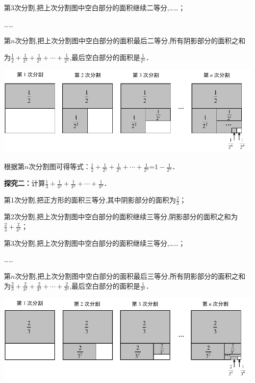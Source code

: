 \documentclass[10pt,a4paper]{ctexart}
\begin{document}
	第3次分割,把上次分割图中空白部分的面积继续二等分,{\ldots}{\ldots}；
	
	{\ldots}{\ldots}
	
	第$n$次分割,把上次分割图中空白部分的面积最后二等分,所有阴影部分的面积之和
	
	为${{\frac{{{1}}}{{{2}}}}{+}{\frac{{{1}}}{{{2}{^{{2}}}}}}{+}{\frac{{{1}}}{{{2}{^{{3}}}}}}{+}{\cdots 
		}{+}{\frac{{{1}}}{{{2}{^{{n}}}}}}}$,最后空白部分的面积是${{\frac{{{1}}}{{{2}{^{{n}}}}}}}$．
	
	\begin{center}
		\includegraphics[width=0.8\linewidth]{23/2014a}
	\end{center}
	
	
	根据第$n$次分割图可得等式：${{\frac{{{1}}}{{{2}}}}{+}{\frac{{{1}}}{{{2}{^{{2}}}}}}{+}{\frac{{{1}}}{{{2}{^{{3}}}}}}{+}{\cdots 
		}{+}{\frac{{{1}}}{{{2}{^{{n}}}}}}}$=${{1}{-}{\frac{{{1}}}{{{2}{^{{n}}}}}}}$．
	
	\textbf{探究二：}计算${{\frac{{{1}}}{{{3}}}}{+}{\frac{{{1}}}{{{3}{^{{2}}}}}}{+}{\frac{{{1}}}{{{3}{^{{3}}}}}}{+}{\cdots 
		}{+}{\frac{{{1}}}{{{3}{^{{n}}}}}}}$．
	
	第1次分割,把正方形的面积三等分,其中阴影部分的面积为${{\frac{{{2}}}{{{3}}}}}$；
	
	第2次分割,把上次分割图中空白部分的面积继续三等分,阴影部分的面积之和为${{\frac{{{2}}}{{{3}}}}{+}{\frac{{{2}}}{{{3}{^{{2}}}}}}}$；
	
	第3次分割,把上次分割图中空白部分的面积继续三等分,{\ldots}{\ldots}；
	
	{\ldots}{\ldots}
	
	第$n$次分割,把上次分割图中空白部分的面积最后三等分,所有阴影部分的面积之和为${{\frac{{{2}}}{{{3}}}}{+}{\frac{{{2}}}{{{3}{^{{2}}}}}}{+}{\frac{{{2}}}{{{3}{^{{3}}}}}}{+}{\cdots 
		}{+}{\frac{{{2}}}{{{3}{^{{n}}}}}}}$,最后空白部分的面积是${{\frac{{{1}}}{{{3}{^{{n}}}}}}}$．
	
	\begin{center}
		\includegraphics[width=0.8\linewidth]{23/2014b}
	\end{center}
\end{document}
